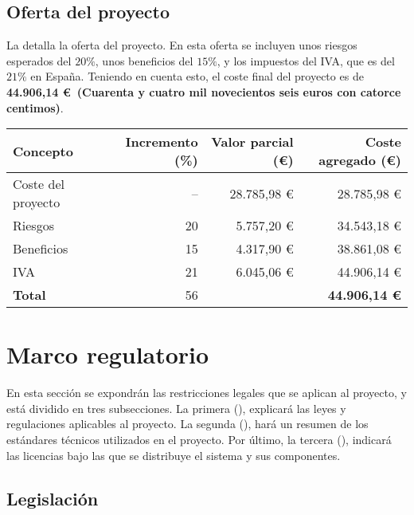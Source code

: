 \subsection{Oferta del proyecto}\label{subsec:offer}

La  detalla la oferta del proyecto. En esta oferta se
incluyen unos riesgos esperados del $20 \%$, unos beneficios del $15 \%$, y los
impuestos del IVA, que es del $21 \%$ en España. Teniendo en cuenta esto, el
coste final del proyecto es de \textbf{44.906,14 \euro~(Cuarenta y cuatro mil
novecientos seis euros con catorce centimos)}.

\begin{table}[htb]
    {
      \begin{tabular}{lrrr}
        \toprule
        \textbf{Concepto} & \textbf{Incremento (\%)} & \textbf{Valor parcial (\euro)} & \textbf{Coste agregado (\euro)} \\
        \midrule
        Coste del proyecto & -- & 28.785,98 \euro & 28.785,98 \euro \\
        Riesgos            & 20 &  5.757,20 \euro & 34.543,18 \euro \\
        Beneficios         & 15 &  4.317,90 \euro & 38.861,08 \euro \\
        IVA                & 21 &  6.045,06 \euro & 44.906,14 \euro \\
        \midrule
        \textbf{Total}     & 56 &                 & \textbf{44.906,14 \euro} \\
        \bottomrule
      \end{tabular}
    }
\end{table}

\section{Marco regulatorio}\label{sec:regulation}

En esta sección se expondrán las restricciones legales que se aplican al
proyecto, y está dividido en tres subsecciones. La primera
(), explicará las leyes y regulaciones aplicables al
proyecto. La segunda (), hará un resumen de los
estándares técnicos utilizados en el proyecto. Por último, la tercera
(), indicará las licencias bajo las que se distribuye el
sistema y sus componentes.

\subsection{Legislación}\label{subsec:legislation}

